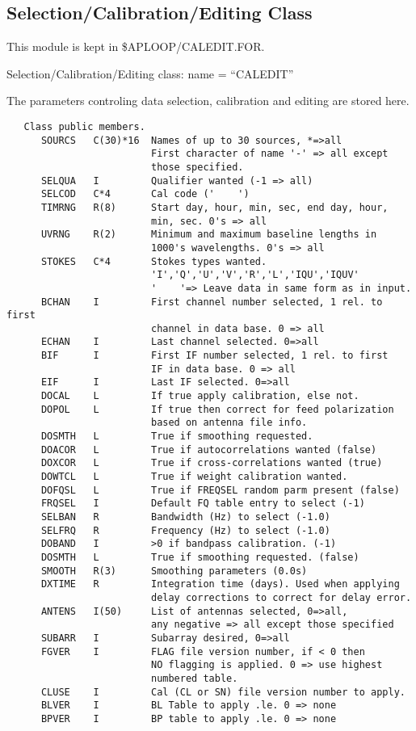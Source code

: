 \subsection{Selection/Calibration/Editing Class}

   This module is kept in \$APLOOP/CALEDIT.FOR.

   Selection/Calibration/Editing class: name = ``CALEDIT''

   The parameters controling data selection, calibration and editing
are stored here.
{\small\begin{verbatim}
   Class public members.
      SOURCS   C(30)*16  Names of up to 30 sources, *=>all
                         First character of name '-' => all except
                         those specified.
      SELQUA   I         Qualifier wanted (-1 => all)
      SELCOD   C*4       Cal code ('    ')
      TIMRNG   R(8)      Start day, hour, min, sec, end day, hour,
                         min, sec. 0's => all
      UVRNG    R(2)      Minimum and maximum baseline lengths in
                         1000's wavelengths. 0's => all
      STOKES   C*4       Stokes types wanted.
                         'I','Q','U','V','R','L','IQU','IQUV'
                         '    '=> Leave data in same form as in input.
      BCHAN    I         First channel number selected, 1 rel. to first
                         channel in data base. 0 => all
      ECHAN    I         Last channel selected. 0=>all
      BIF      I         First IF number selected, 1 rel. to first
                         IF in data base. 0 => all
      EIF      I         Last IF selected. 0=>all
      DOCAL    L         If true apply calibration, else not.
      DOPOL    L         If true then correct for feed polarization
                         based on antenna file info.
      DOSMTH   L         True if smoothing requested.
      DOACOR   L         True if autocorrelations wanted (false)
      DOXCOR   L         True if cross-correlations wanted (true)
      DOWTCL   L         True if weight calibration wanted.
      DOFQSL   L         True if FREQSEL random parm present (false)
      FRQSEL   I         Default FQ table entry to select (-1)
      SELBAN   R         Bandwidth (Hz) to select (-1.0)
      SELFRQ   R         Frequency (Hz) to select (-1.0)
      DOBAND   I         >0 if bandpass calibration. (-1)
      DOSMTH   L         True if smoothing requested. (false)
      SMOOTH   R(3)      Smoothing parameters (0.0s)
      DXTIME   R         Integration time (days). Used when applying
                         delay corrections to correct for delay error.
      ANTENS   I(50)     List of antennas selected, 0=>all,
                         any negative => all except those specified
      SUBARR   I         Subarray desired, 0=>all
      FGVER    I         FLAG file version number, if < 0 then
                         NO flagging is applied. 0 => use highest
                         numbered table.
      CLUSE    I         Cal (CL or SN) file version number to apply.
      BLVER    I         BL Table to apply .le. 0 => none
      BPVER    I         BP table to apply .le. 0 => none


\end{verbatim}}

